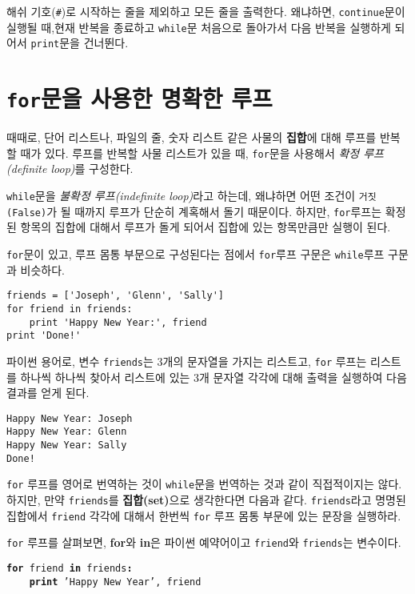 해쉬 기호(\verb"#")로 시작하는 줄을 제외하고 모든 줄을 출력한다. 
왜냐하면, {\tt continue}문이 실행될 때,현재 반복을 종료하고 {\tt while}문 처음으로 돌아가서 다음 반복을 실행하게 되어서 {\tt print}문을 건너뛴다.

\section{  {\tt for}문을 사용한 명확한 루프 }

때때로, 단어 리스트나, 파일의 줄, 숫자 리스트 같은 사물의 {\bf 집합}에 대해 루프를 반복할 때가 있다.
루프를 반복할 사물 리스트가 있을 때, {\tt for}문을 사용해서 \emph{확정 루프(definite loop)}를 구성한다.

{\tt while}문을 \emph{불확정 루프(indefinite loop)}라고 하는데, 왜냐하면 어떤 조건이 {\tt 거짓(False)}가 될 때까지 루프가 단순히 계혹해서 돌기 때문이다. 
하지만, {\tt for}루프는 확정된 항목의 집합에 대해서 루프가 돌게 되어서 집합에 있는 항목만큼만 실행이 된다.

{\tt for}문이 있고, 루프 몸통 부문으로 구성된다는 점에서 {\tt for}루프 구문은 {\tt while}루프 구문과 비슷하다.

\beforeverb
\begin{verbatim}
friends = ['Joseph', 'Glenn', 'Sally']
for friend in friends:
    print 'Happy New Year:', friend
print 'Done!'
\end{verbatim}
\afterverb
%

파이썬 용어로, 변수 {\tt friends}는 3개의 문자열을 가지는 리스트고,
{\tt for} 루프는 리스트를 하나씩 하나씩 찾아서 리스트에 있는 3개 문자열 각각에 대해 출력을 실행하여 다음 결과를 얻게 된다.

\beforeverb
\begin{verbatim}
Happy New Year: Joseph
Happy New Year: Glenn
Happy New Year: Sally
Done!
\end{verbatim}
\afterverb
%

{\tt for} 루프를 영어로 번역하는 것이 {\tt while}문을 번역하는 것과 같이 직접적이지는 않다. 
하지만, 만약 {\tt friends}를 {\bf 집합(set)}으로 생각한다면 다음과 같다.
{\tt friends}라고 명명된 집합에서 {\tt friend} 각각에 대해서 한번씩 {\tt for} 루프 몸통 부문에 있는 문장을 실행하라.

{\tt for} 루프를 살펴보면, {\bf for}와 {\bf in}은 파이썬 예약어이고 {\tt friend}와 {\tt friends}는 변수이다.

{\tt {\bf for} friend {\bf in} friends{\bf :}\\
\verb"    "{\bf print} 'Happy New Year', friend }

